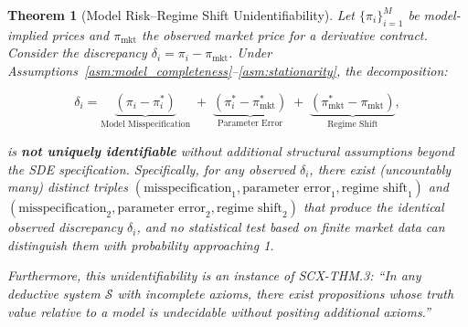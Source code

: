 \documentclass[11pt,a4paper]{article}
\theoremstyle{plain}
\newtheorem{theorem}{Theorem}[section]
\theoremstyle{definition}
\theoremstyle{remark}
\begin{document}
\begin{theorem}[Model Risk--Regime Shift Unidentifiability]\label{thm:unidentifiability}
Let $\{\pi_i\}_{i=1}^M$ be model-implied prices and $\pi_{\text{mkt}}$ the observed market price for a derivative contract. Consider the discrepancy $\delta_i = \pi_i - \pi_{\text{mkt}}$. Under Assumptions~\ref{asm:model_completeness}--\ref{asm:stationarity}, the decomposition:

\begin{equation}\label{eq:decomposition}
  \delta_i = \underbrace{(\pi_i - \pi_i^*)}_{\text{Model Misspecification}} \;+\; \underbrace{(\pi_i^* - \pi_{\text{mkt}}^*)}_{\text{Parameter Error}} \;+\; \underbrace{(\pi_{\text{mkt}}^* - \pi_{\text{mkt}})}_{\text{Regime Shift}},
\end{equation}

is \textbf{not uniquely identifiable} without additional structural assumptions beyond the SDE specification. Specifically, for any observed $\delta_i$, there exist (uncountably many) distinct triples
$(\text{misspecification}_1, \text{parameter error}_1, \text{regime shift}_1)$
and
$(\text{misspecification}_2, \text{parameter error}_2, \text{regime shift}_2)$
that produce the identical observed discrepancy $\delta_i$, and no statistical test based on finite market data can distinguish them with probability approaching 1.

Furthermore, this unidentifiability is an instance of \textsc{SCX-THM.3}: \emph{``In any deductive system $\mathcal{S}$ with incomplete axioms, there exist propositions whose truth value relative to a model is undecidable without positing additional axioms.''}
\end{theorem}
\end{document}
